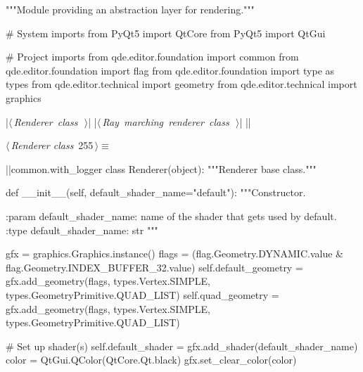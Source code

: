 \documentclass[%
    a4paper,    %
    justified,  %
    nobib,      %
    openany     %
]{tufte-book}
\makeatletter
\renewcommand{\label}[1]{\@tufte@label{##1}}%
\makeatother
\begin{document}
\begin{fullwidth}
\begin{flushleft}
\begin{minipage}{\linewidth}
\begin{pythoncode}
"""Module providing an abstraction layer for rendering."""

# System imports
from PyQt5 import QtCore
from PyQt5 import QtGui

# Project imports
from qde.editor.foundation import common
from qde.editor.foundation import flag
from qde.editor.foundation import type as types
from qde.editor.technical  import geometry
from qde.editor.technical  import graphics


|\hbox{$\langle\,${\itshape Renderer class}\nobreak\ {\footnotesize {}}$\,\rangle$}|
|\hbox{$\langle\,${\itshape Ray marching renderer class}\nobreak\ {\footnotesize {}}$\,\rangle$}|
|\NWsep|
\end{pythoncode}
\vspace{1.5ex}
\footnotesize
\begin{list}{}{\setlength{\itemsep}{-\parsep}\setlength{\itemindent}{-\leftmargin}}

\item{}
\end{list}
\end{minipage}\vspace{4ex}
\end{flushleft}
\begin{flushleft} \small
\begin{minipage}{\linewidth}\label{scrap282}\raggedright\small
{} $\langle\,${\itshape Renderer class}\nobreak\ {\footnotesize {255}}$\,\rangle\equiv$
\vspace{-1ex}
\begin{pythoncode}
|\normalfont{}\fontfamily{}|common.with_logger
class Renderer(object):
    """Renderer base class."""

    def __init__(self, default_shader_name="default"):
        """Constructor.

        :param default_shader_name: name of the shader that gets used by default.
        :type  default_shader_name: str
        """

        gfx = graphics.Graphics.instance()
        flags = (flag.Geometry.DYNAMIC.value &
                 flag.Geometry.INDEX_BUFFER_32.value)
        self.default_geometry = gfx.add_geometry(flags, types.Vertex.SIMPLE,
                                                 types.GeometryPrimitive.QUAD_LIST)
        self.quad_geometry = gfx.add_geometry(flags, types.Vertex.SIMPLE,
                                              types.GeometryPrimitive.QUAD_LIST)

        # Set up shader(s)
        self.default_shader = gfx.add_shader(default_shader_name)
        color = QtGui.QColor(QtCore.Qt.black)
        gfx.set_clear_color(color)


\end{pythoncode}
\end{minipage}
\end{flushleft}
\end{fullwidth}
\end{document}
